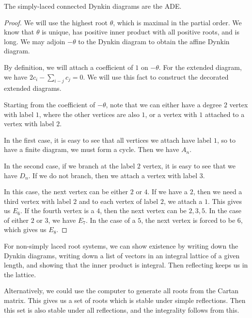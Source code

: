 \documentclass[twoside, 10pt]{article}
\begin{document}
    \begin{thm} The simply-laced connected Dynkin diagrams are the ADE.
    \end{thm}

    \begin{proof} We will use the highest root $\theta$, which is maximal in
        the partial order. We know that $\theta$ is unique, has positive inner
        product with all positive roots, and is long. We may adjoin $-\theta$
        to the Dynkin diagram to obtain the affine Dynkin diagram.

        By definition, we will attach a coefficient of $1$ on $-\theta$. For
        the extended diagram, we have $2c_i - \sum_{i-j} c_j = 0$. We will use
        this fact to construct the decorated extended diagrams.

        Starting from the coefficient of $-\theta$, note that we can either
        have a degree $2$ vertex with label $1$, where the other vertices are
        also $1$, or a vertex with $1$ attached to a vertex with label $2$.

        In the first case, it is easy to see that all vertices we attach have
        label $1$, so to have a finite diagram, we must form a cycle. Then we
        have $A_n$.

        In the second case, if we branch at the label $2$ vertex, it is easy to
        see that we have $D_n$. If we do not branch, then we attach a vertex
        with label $3$.

        In this case, the next vertex can be either $2$ or $4$. If we have a
    $2$, then we need a third vertex with label $2$ and to each vertex of label
$2$, we attach a $1$. This gives us $E_6$. If the fourth vertex is a $4$, then
the next vertex can be $2,3,5$. In the case of either $2$ or $3$, we have
$E_7$. In the case of a $5$, the next vertex is forced to be $6$, which gives
us $E_8$.  \end{proof}

    For non-simply laced root systems, we can show existence by writing down
    the Dynkin diagrams, writing down a list of vectors in an integral lattice
    of a given length, and showing that the inner product is integral. Then
    reflecting keeps us in the lattice.

    Alternatively, we could use the computer to generate all roots from the
    Cartan matrix. This gives us a set of roots which is stable under simple
    reflections. Then this set is also stable under all reflections, and the
    integrality follows from this.
\end{document}
